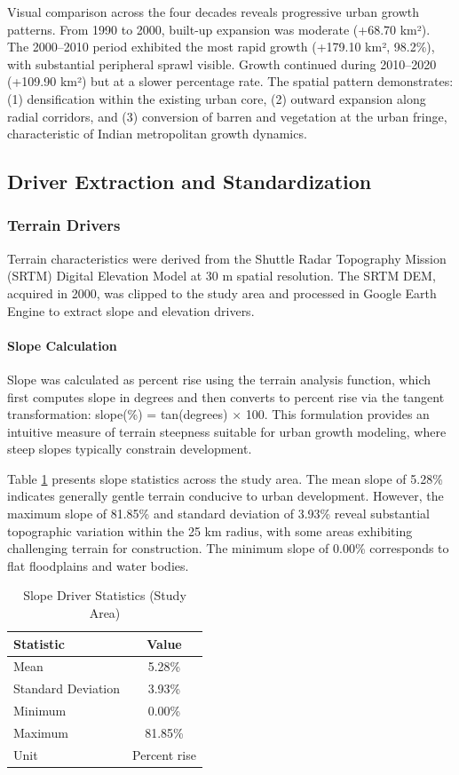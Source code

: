 \documentclass[conference]{IEEEtran}
\begin{document}
Visual comparison across the four decades reveals progressive urban growth patterns. From 1990 to 2000, built-up expansion was moderate (+68.70 km²). The 2000--2010 period exhibited the most rapid growth (+179.10 km², 98.2\%), with substantial peripheral sprawl visible. Growth continued during 2010--2020 (+109.90 km²) but at a slower percentage rate. The spatial pattern demonstrates: (1) densification within the existing urban core, (2) outward expansion along radial corridors, and (3) conversion of barren and vegetation at the urban fringe, characteristic of Indian metropolitan growth dynamics.
\subsection{Driver Extraction and Standardization}

\subsubsection{Terrain Drivers}

Terrain characteristics were derived from the Shuttle Radar Topography Mission (SRTM) Digital Elevation Model at 30 m spatial resolution. The SRTM DEM, acquired in 2000, was clipped to the study area and processed in Google Earth Engine to extract slope and elevation drivers.

\paragraph{Slope Calculation}
Slope was calculated as percent rise using the terrain analysis function, which first computes slope in degrees and then converts to percent rise via the tangent transformation: slope(\%) = tan(degrees) $\times$ 100. This formulation provides an intuitive measure of terrain steepness suitable for urban growth modeling, where steep slopes typically constrain development.

Table \ref{tab:slope_stats} presents slope statistics across the study area. The mean slope of 5.28\% indicates generally gentle terrain conducive to urban development. However, the maximum slope of 81.85\% and standard deviation of 3.93\% reveal substantial topographic variation within the 25 km radius, with some areas exhibiting challenging terrain for construction. The minimum slope of 0.00\% corresponds to flat floodplains and water bodies.

\begin{table}[!t]
\caption{Slope Driver Statistics (Study Area)}
\label{tab:slope_stats}
\centering
\small
\begin{tabular}{lc}
\toprule
\textbf{Statistic} & \textbf{Value} \\
\midrule
Mean & 5.28\% \\
Standard Deviation & 3.93\% \\
Minimum & 0.00\% \\
Maximum & 81.85\% \\
Unit & Percent rise \\
\bottomrule
\end{tabular}
\end{table}
\end{document}
